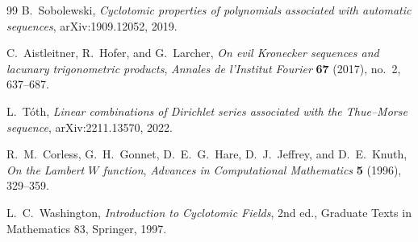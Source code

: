 \documentclass[11pt,oneside]{article}
\theoremstyle{definition}
\theoremstyle{remark}
\begin{document}
\begin{thebibliography}{99}
B.~Sobolewski,
\emph{Cyclotomic properties of polynomials associated with automatic sequences},
arXiv:1909.12052, 2019.

C.~Aistleitner, R.~Hofer, and G.~Larcher,
\emph{On evil Kronecker sequences and lacunary trigonometric products},
\emph{Annales de l'Institut Fourier} \textbf{67} (2017), no.~2, 637--687.

L.~T\'oth,
\emph{Linear combinations of Dirichlet series associated with the Thue--Morse sequence},
arXiv:2211.13570, 2022.

R.~M.~Corless, G.~H.~Gonnet, D.~E.~G.~Hare, D.~J.~Jeffrey, and D.~E.~Knuth,
\emph{On the Lambert $W$ function},
\emph{Advances in Computational Mathematics} \textbf{5} (1996), 329--359.

L.~C.~Washington,
\emph{Introduction to Cyclotomic Fields}, 2nd ed.,
Graduate Texts in Mathematics 83, Springer, 1997.

\end{thebibliography}
\end{document}
